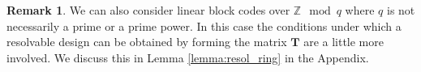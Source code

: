 \documentclass[journal,twocolumn]{IEEEtran}
\theoremstyle{definition}
\newtheorem{remark}{Remark}
\newcommand{\calA}{\mathcal{A}}
\newcommand{\calP}{\mathcal{P}}
\newcommand{\bfu}{\mathbf{u}}
\newcommand{\bfT}{\mathbf{T}}
\newcommand{\bfG}{\mathbf{G}}
\newcommand{\aditya}[1]{\marginpar{+}{\bf Aditya's remark}: {\em #1}}
\newcommand{\litang}[1]{\marginpar{+}{\bf Li's remark}: {\em #1}}
\begin{document}
\begin{remark} We can also consider linear block codes over $\mathbb{Z} \mod q$ where $q$ is not necessarily a prime or a prime power. In this case the conditions under which a resolvable design can be obtained by forming the matrix $\bfT$ are a little more involved. We discuss this in Lemma \ref{lemma:resol_ring} in the Appendix.
\end{remark}
%	
\end{document}
